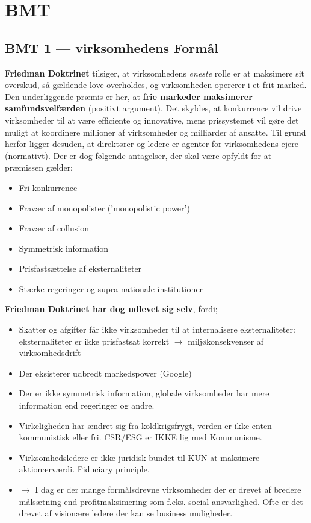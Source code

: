 \documentclass[10pt,reqno, usenames]{article}
\begin{document}
\newpage
\section{BMT}
\subsection{BMT 1 — virksomhedens Formål}
\textbf{Friedman Doktrinet} tilsiger, at virksomhedens \textit{eneste} rolle er at maksimere sit overskud, så gældende love overholdes, og virksomheden opererer i et frit marked. Den underliggende præmis er her, at \textbf{frie markeder maksimerer samfundsvelfærden} (positivt argument). Det skyldes, at konkurrence vil drive virksomheder til at være efficiente og
innovative, mens prissystemet vil gøre det muligt at koordinere
millioner af virksomheder og milliarder af ansatte. Til grund herfor ligger desuden, at direktører og ledere er agenter for virksomhedens
ejere (normativt). Der er dog følgende antagelser, der skal være opfyldt for at præmissen gælder; 

\begin{itemize}
    \item  Fri konkurrence
    \item Fravær af monopolister ('monopolistic power')
    \item Fravær af collusion
    \item Symmetrisk information
    \item Prisfastsættelse af eksternaliteter
    \item Stærke regeringer og supra nationale institutioner
\end{itemize}

\textbf{Friedman Doktrinet har dog udlevet sig selv}, fordi; 

\begin{itemize}
    \item Skatter og afgifter får ikke virksomheder til at internalisere eksternaliteter: eksternaliteter er ikke prisfastsat korrekt $\rightarrow$ miljøkonsekvenser af virksomhedsdrift
    \item Der eksisterer udbredt markedspower (Google)
    \item Der er ikke symmetrisk information, globale virksomheder har mere information end regeringer og andre.
    \item Virkeligheden har ændret sig fra koldkrigsfrygt, verden er ikke enten kommunistisk eller fri. CSR/ESG er IKKE lig med Kommunisme.
    \item Virksomhedsledere er ikke juridisk bundet til KUN at maksimere aktionærværdi. Fiduciary principle.
    \item $\rightarrow$ I dag er der mange formålsdrevne virksomheder der er drevet af bredere målsætning end profitmaksimering som f.eks. social ansvarlighed. Ofte er det drevet af visionære ledere der kan se business muligheder.
\end{itemize}
\end{document}
